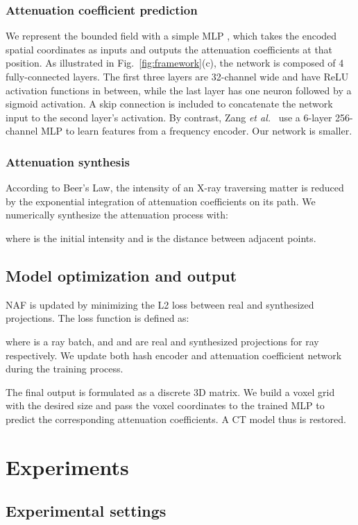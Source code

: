 \documentclass[runningheads]{llncs}
\begin{document}
\subsubsection{Attenuation coefficient prediction}
We represent the bounded field with a simple MLP , which takes the encoded spatial coordinates as inputs and outputs the attenuation coefficients  at that position. As illustrated in Fig.~\ref{fig:framework}(c), the network is composed of 4 fully-connected layers. The first three layers are 32-channel wide and have ReLU activation functions in between, while the last layer has one neuron followed by a sigmoid activation. A skip connection is included to concatenate the network input to the second layer's activation. By contrast, Zang \textit{et al.}~\cite{zang2021intratomo} use a 6-layer 256-channel MLP to learn features from a frequency encoder. Our network is  smaller.


\subsubsection{Attenuation synthesis}
According to Beer's Law, the intensity of an X-ray traversing matter is reduced by the exponential integration of attenuation coefficients on its path. We numerically synthesize the attenuation process with:


where  is the initial intensity and  is the distance between adjacent points.


\subsection{Model optimization and output}
NAF is updated by minimizing the L2 loss between real and synthesized projections. The loss function  is defined as:

where  is a ray batch, and  and  are real and synthesized projections for ray  respectively. We update both hash encoder  and attenuation coefficient network  during the training process.

The final output is formulated as a discrete 3D matrix. We build a voxel grid with the desired size and pass the voxel coordinates to the trained MLP to predict the corresponding attenuation coefficients. A CT model thus is restored.



\section{Experiments}
\subsection{Experimental settings}
\end{document}
